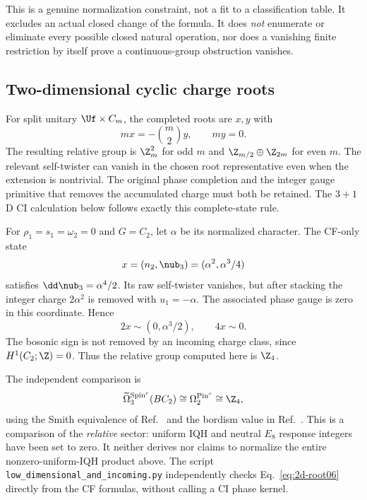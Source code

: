 This is a genuine normalization constraint, not a fit to a classification table. It excludes an actual closed change of the formula. It does \emph{not} enumerate or eliminate every possible closed natural operation, nor does a vanishing finite restriction by itself prove a continuous-group obstruction vanishes.


\subsection{Two-dimensional cyclic charge roots}\label{subsec:2d-examples}
For split unitary $\Uf\times C_m$, the completed roots are $x,y$ with
\begin{equation}
mx=-\binom m2y,\qquad my=0.
\end{equation}
The resulting relative group is $\Z_m^2$ for odd $m$ and $\Z_{m/2}\oplus\Z_{2m}$ for even $m$. The relevant self-twister can vanish in the chosen root representative even when the extension is nontrivial. The original phase completion and the integer gauge primitive that removes the accumulated charge must both be retained. The $3+1$D CI calculation below follows exactly this complete-state rule.

\label{sec:2d-bordism06}
For ${\rho_1}={s_1}=\omega_2=0$ and $G=C_2$, let $\alpha$ be its normalized character. The CF-only state
\begin{equation}
             x=(n_2,\nub_3)=(\alpha^2,\alpha^3/4)
\end{equation}
satisfies $\dd\nub_3=\alpha^4/2$. Its raw self-twister vanishes, but after stacking the integer charge $2\alpha^2$ is removed with $u_1=-\alpha$. The associated phase gauge is zero in this coordinate. Hence
\begin{equation}\label{eq:2d-root06}
                   2x\sim(0,\alpha^3/2),\qquad 4x\sim0.
\end{equation}
The bosonic sign is not removed by an incoming charge class, since $H^1(C_2;\Z)=0$. Thus the relative group computed here is $\Z_4$.

The independent comparison is
\begin{equation}
  \widetilde\Omega_3^{\operatorname{Spin}^c}(BC_2)
       \cong\Omega_2^{\operatorname{Pin}^c}\cong\Z_4,
\end{equation}
using the Smith equivalence of Ref.~\cite[Example~7.11]{SmithFiber} and the bordism value in Ref.~\cite[Theorem~9.87]{FreedHopkins}. This is a comparison of the \emph{relative} sector: uniform IQH and neutral $E_8$ response integers have been set to zero. It neither derives nor claims to normalize the entire nonzero-uniform-IQH product above. The script \texttt{low\_dimensional\_and\_incoming.py} independently checks Eq.~\eqref{eq:2d-root06} directly from the CF formulas, without calling a CI phase kernel.

